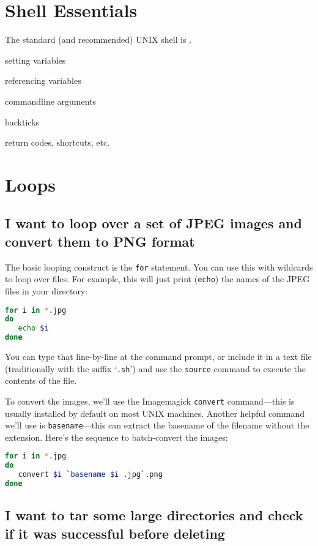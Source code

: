 \section{Shell Essentials}

The standard (and recommended) UNIX shell is \bash.

setting variables

referencing variables

commandline arguments

backticks

return codes, shortcuts, etc.


\section{Loops}

\subsection{I want to loop over a set of JPEG images and convert them to PNG format}

The basic looping construct is the {\tt for} statement.  You can use this with wildcards to
loop over files.  For example, this will just print ({\tt echo}) the names of the JPEG
files in your directory:

\begin{lstlisting}[language={bash},upquote=true]
for i in *.jpg
do
   echo $i
done
\end{lstlisting}

You can type that line-by-line at the command prompt, or include it in
a text file (traditionally with the suffix `{\tt .sh}') and use the
{\tt source} command to execute the contents of the file.

To convert the images, we'll use the Imagemagick {\tt convert}
command---this is usually installed by default on most UNIX machines.
Another helpful command we'll use is {\tt basename}---this can extract
the basename of the filename without the extension.  Here's the
sequence to batch-convert the images:

\begin{lstlisting}[language={bash}]
for i in *.jpg
do
   convert $i `basename $i .jpg`.png
done
\end{lstlisting}


\subsection{I want to tar some large directories and check if it was successful before deleting}

